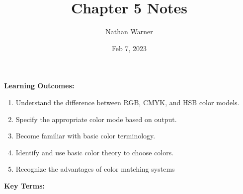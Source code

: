 \documentclass{report}
\title{\Huge{Chapter 5 Notes}}
\author{\huge{Nathan Warner}}
\date{\huge{Feb 7, 2023}}
\begin{document}
    \maketitle

    \bigbreak \noindent 
     \begin{Large}
        \noindent \textbf{Learning Outcomes:}
     \end{Large}
     \bigbreak \noindent \bigbreak \noindent
     \begin{enumerate}
            \item Understand the difference between RGB, CMYK, and HSB color models.
            \item  Specify the appropriate color mode based on output.
            \item  Become familiar with basic color terminology.
           \item  Identify and use basic color theory to choose colors.
           \item  Recognize the advantages of color matching systems
     \end{enumerate}
  \bigbreak \noindent \bigbreak \noindent \bigbreak
    \begin{Large}
        \noindent \textbf{Key Terms:}
     \end{Large}
     
\end{document}

